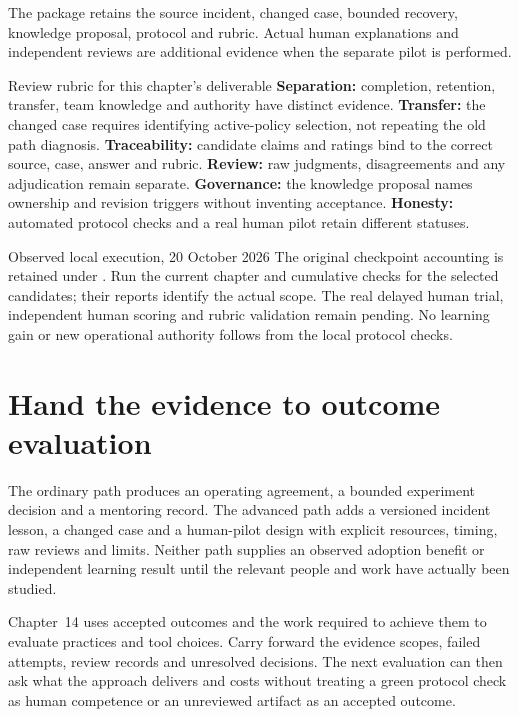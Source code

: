 The package retains the source incident, changed case, bounded recovery, knowledge proposal, protocol and rubric. Actual human explanations and independent reviews are additional evidence when the separate pilot is performed.

\begin{readerbox}{Review rubric for this chapter's deliverable}
\textbf{Separation:} completion, retention, transfer, team knowledge and authority have distinct evidence.
\textbf{Transfer:} the changed case requires identifying active-policy selection, not repeating the old path diagnosis.
\textbf{Traceability:} candidate claims and ratings bind to the correct source, case, answer and rubric.
\textbf{Review:} raw judgments, disagreements and any adjudication remain separate.
\textbf{Governance:} the knowledge proposal names ownership and revision triggers without inventing acceptance.
\textbf{Honesty:} automated protocol checks and a real human pilot retain different statuses.
\end{readerbox}

\begin{readerbox}{Observed local execution, 20 October 2026}
The original checkpoint accounting is retained under . Run the current chapter and cumulative checks for the selected candidates; their reports identify the actual scope. The real delayed human trial, independent human scoring and rubric validation remain pending. No learning gain or new operational authority follows from the local protocol checks.
\end{readerbox}

\section{Hand the evidence to outcome evaluation}\label{sec:ch13-next}

The ordinary path produces an operating agreement, a bounded experiment decision and a mentoring record. The advanced path adds a versioned incident lesson, a changed case and a human-pilot design with explicit resources, timing, raw reviews and limits. Neither path supplies an observed adoption benefit or independent learning result until the relevant people and work have actually been studied.

Chapter~14 uses accepted outcomes and the work required to achieve them to evaluate practices and tool choices. Carry forward the evidence scopes, failed attempts, review records and unresolved decisions. The next evaluation can then ask what the approach delivers and costs without treating a green protocol check as human competence or an unreviewed artifact as an accepted outcome.
